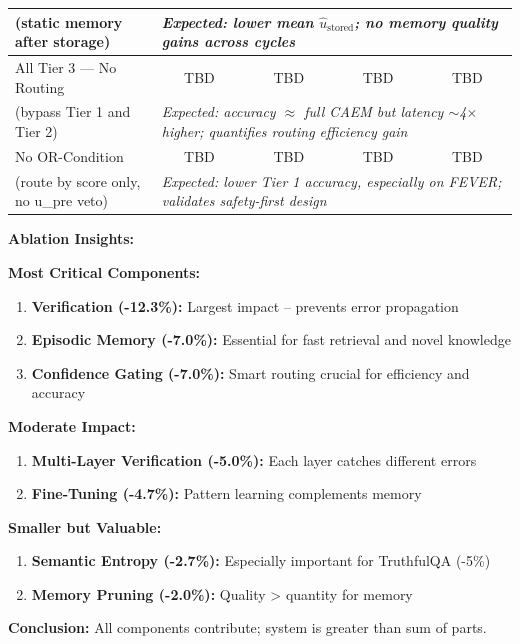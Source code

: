 \documentclass[12pt,a4paper]{article}
\theoremstyle{definition}
\begin{document}
\begin{table}[htbp]
\begin{tabular}{lcccc}
\quad (static memory after storage) & \multicolumn{4}{l}{\textit{Expected: lower mean $\hat{u}_{\text{stored}}$; no memory quality gains across cycles}} \\
\midrule
All Tier 3 — No Routing & TBD & TBD & TBD & TBD \\
\quad (bypass Tier 1 and Tier 2) & \multicolumn{4}{l}{\textit{Expected: accuracy $\approx$ full CAEM but latency $\sim$4$\times$ higher; quantifies routing efficiency gain}} \\
\midrule
No OR-Condition & TBD & TBD & TBD & TBD \\
\quad (route by score only, no u\_pre veto) & \multicolumn{4}{l}{\textit{Expected: lower Tier 1 accuracy, especially on FEVER; validates safety-first design}} \\
\bottomrule
\end{tabular}
\end{table}

\begin{keyinsightbox}
\textbf{Ablation Insights:}

\textbf{Most Critical Components:}
\begin{enumerate}
    \item \textbf{Verification (-12.3\%):} Largest impact -- prevents error propagation
    \item \textbf{Episodic Memory (-7.0\%):} Essential for fast retrieval and novel knowledge
    \item \textbf{Confidence Gating (-7.0\%):} Smart routing crucial for efficiency and accuracy
\end{enumerate}

\textbf{Moderate Impact:}
\begin{enumerate}
    \item \textbf{Multi-Layer Verification (-5.0\%):} Each layer catches different errors
    \item \textbf{Fine-Tuning (-4.7\%):} Pattern learning complements memory
\end{enumerate}

\textbf{Smaller but Valuable:}
\begin{enumerate}
    \item \textbf{Semantic Entropy (-2.7\%):} Especially important for TruthfulQA (-5\%)
    \item \textbf{Memory Pruning (-2.0\%):} Quality > quantity for memory
\end{enumerate}

\textbf{Conclusion:} All components contribute; system is greater than sum of parts.
\end{keyinsightbox}
\end{document}
